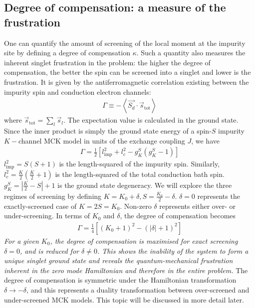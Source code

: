 \documentclass[reprint,prb,superscriptaddress]{revtex4-2}
\begin{document}
\subsection{Degree of compensation: a measure of the frustration}
One can quantify the amount of screening of the local moment at the impurity site by defining a degree of compensation \(\kappa\). Such a quantity also measures the inherent singlet frustration in the problem: the higher the degree of compensation, the better the spin can be screened into a singlet and lower is the frustration. It is given by the antiferromagnetic correlation existing between the impurity spin and conduction electron channels:
\begin{equation}\begin{aligned}
	\Gamma \equiv - \left< \vec{S_d}\cdot \vec{s}_\text{tot}\right>
\end{aligned}\end{equation}
where \(\vec s_\text{tot} = \sum_l \vec s_l\). The expectation value is calculated in the ground state. Since the inner product is simply the ground state energy of a spin-\(S\) impurity \(K-\)channel MCK model in units of the exchange coupling \(J\), we have
\begin{equation}\begin{aligned}
	\Gamma = \frac{1}{2} \left[ l_\text{imp}^2 + l_c^2 - g^S_K\left( g^S_K - 1 \right)\right]
\end{aligned}\end{equation}
\(l_\text{imp}^2 = S(S+1)\) is the length-squared of the impurity spin. Similarly, \(l_c^2 = \frac{K}{2}\left(\frac{K}{2} + 1\right) \) is the length-squared of the total conduction bath spin. \(g^S_K = |\frac{K}{2} - S| + 1\) is the ground state degeneracy. We will explore the three regimes of screening by defining \(K = K_0 + \delta, S = \frac{K_0}{2} - \delta\). \(\delta=0\) represents the exactly-screened case of \(K = 2S = K_0\). Non-zero \(\delta\) represents either over- or under-screening. In terms of \(K_0\) and \(\delta\), the degree of compensation becomes
\begin{equation}\begin{aligned}
	\label{gamma}
	\Gamma = \frac{1}{4}\left[\left( K_0 + 1 \right) ^2 - \left(|\delta| + 1 \right) ^2\right] 
\end{aligned}\end{equation}
\textit{For a given \(K_0\), the degree of compensation is maximised for exact screening \(\delta=0\), and is reduced for \(\delta \neq 0\). This shows the inability of the system to form a unique singlet ground state and reveals the quantum-mechanical frustration inherent in the zero mode Hamiltonian and therefore in the entire problem.} The degree of compensation is symmetric under the Hamiltonian transformation \(\delta \to -\delta\), and this represents a duality transformation between over-screened and under-screened MCK models. This topic will be discussed in more detail later.
\end{document}
